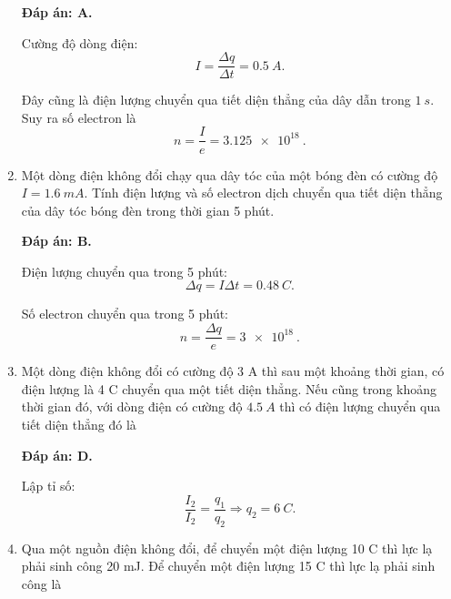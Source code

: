 \begin{enumerate}[label=\bfseries Câu \arabic*:]
{	}
	\loigiai
	{	\textbf{Đáp án: A.}
		
		Cường độ dòng điện:
		$$I=\dfrac{\Delta q}{\Delta t} = \SI{0.5}{A}.$$
		
		Đây cũng là điện lượng chuyển qua tiết diện thẳng của dây dẫn trong $\SI{1}{s}$. Suy ra số electron là
		$$n=\dfrac{I}{e} = \SI{3.125e18}{}.$$
	}
	\item {}
	
	\cauhoi
	{Một dòng điện không đổi chạy qua dây tóc của một bóng đèn có cường độ $I=\SI{1.6}{mA}$. Tính điện lượng và số electron dịch chuyển qua tiết diện thẳng của dây tóc bóng đèn trong thời gian 5 phút.
		
	}
	\loigiai
	{	\textbf{Đáp án: B.}
		
		Điện lượng chuyển qua trong 5 phút:
		$$\Delta q = I \Delta t = \SI{0.48}{C}.$$
		
		Số electron chuyển qua trong 5 phút:
		$$n=\dfrac{\Delta q}{e} = \SI{3e18}{}.$$
	}
	\item {}
	
	\cauhoi
	{Một dòng điện không đổi có cường độ 3 A thì sau một khoảng thời gian, có điện lượng là 4 C chuyển qua một tiết diện thẳng. Nếu cũng trong khoảng thời gian đó, với dòng điện có cường độ $\SI{4.5}{A}$ thì có điện lượng chuyển qua tiết diện thẳng đó là
		
	}
	\loigiai
	{	\textbf{Đáp án: D.}
		
		Lập tỉ số:
		$$\dfrac{I_2}{I_2} = \dfrac{q_1}{q_2} \Rightarrow q_2 = \SI{6}{C}.$$
	}
	\item {}
	
	\cauhoi
	{Qua một nguồn điện không đổi, để chuyển một điện lượng 10 C thì lực lạ phải sinh công 20 mJ. Để chuyển một điện lượng 15 C thì lực lạ phải sinh công là
		
}
\end{enumerate}
